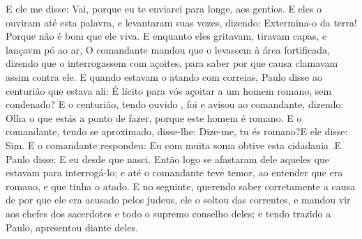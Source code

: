 {  E ele me disse: Vai, porque eu te enviarei para longe, aos gentios.
  E eles o ouviram até esta palavra, e
{} levantaram suas vozes, dizendo: Extermina-o da terra! Porque não é bom que ele viva.
  E enquanto eles gritavam, tiravam
{} capas, e lançavm pó ao ar,
  O comandante mandou que o levassem à área fortificada, dizendo que o interrogassem com açoites, para saber por que causa clamavam assim contra ele.
  E quando estavam o atando com correias, Paulo disse ao centurião que estava ali: É lícito para vós açoitar a um homem romano, sem
{} condenado?
  E o centurião, tendo ouvido
{}, foi e avisou ao comandante, dizendo: Olha o que estás a ponto de fazer, porque este homem é romano.
  E o comandante, tendo se aproximado, disse-lhe: Dize-me, tu és romano?E ele disse: Sim.
  E o comandante respondeu: Eu com muita soma
{} obtive esta cidadania
{} .E Paulo disse: E eu
{} desde que nasci.
  Então logo se afastaram dele aqueles que estavam para interrogá-lo; e até o comandante teve temor, ao entender que
{} era romano, e que tinha o atado.
  E no{} seguinte, querendo saber corretamente a causa de por que ele era acusado pelos judeus, ele o soltou das correntes, e mandou vir aos chefes dos sacerdotes e todo o supremo conselho
 deles; e tendo trazido a Paulo, apresentou
{} diante deles.
\par }

